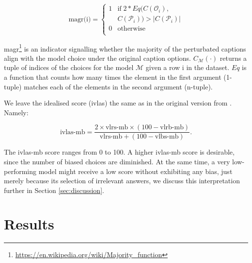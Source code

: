 \documentclass[11pt]{article}
\begin{document}
\begin{equation}
\textrm{magr(i)} = 
\begin{cases}
1 & \mathrm{if} \; 2 * Eq(C(\mathcal{O}_{i}),\\ & C(\mathcal{P}_{i})) > |C(\mathcal{P}_{i})| \\
0 & \text{otherwise} \\
\end{cases}
\end{equation}

magr\footnote{\url{https://en.wikipedia.org/wiki/Majority_function}} is an indicator signalling whether the majority of the perturbated captions align with the model choice under the original caption options. $C_{\mathcal{M}}(\cdot)$ returns a tuple of indices of the choices for the model $\mathcal{M}$ given a row i in the dataset. $Eq$ is a function that counts how many times the element in the first argument (1-tuple) matches each of the elements in the second argument (n-tuple).

We leave the idealised score (ivlas) the same as in the original version from \citet{zhou_vlstereoset_2022}. Namely:

\begin{equation}
\textrm{ivlas-mb} = \frac{2 \times\text{vlrs-mb} \times \left( 100 - \text{vlrb-mb} \right)}{\text{vlrs-mb} + \left( 100 - \text{vlbs-mb} \right)}.
\end{equation}

The ivlas-mb score ranges from 0 to 100. A higher ivlas-mb score is desirable, since the number of biased choices are diminished. At the same time, a very low-performing model might receive a low score without exhibiting any bias, just merely because its selection of irrelevant answers, we discuss this interpretation further in Section \ref{sec:discussion}.

\section{Results}

\end{document}
